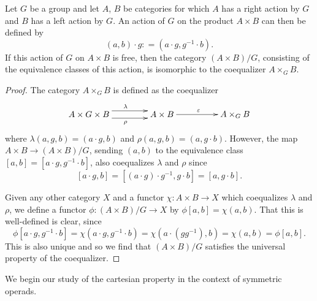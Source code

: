\begin{lem}\label{coeq-lem}
Let $G$ be a group and let $A$, $B$ be categories for which $A$ has a right action by $G$ and $B$ has a left action by $G$. An action of $G$ on the product $A \times B$ can then be defined by
    \[
        (a,b) \cdot g \colon = \left(a \cdot g, g^{-1} \cdot b\right).
    \]
If this action of $G$ on $A \times B$ is free, then the category $(A \times B)/G$, consisting of the equivalence classes of this action, is isomorphic to the coequalizer $A \times_G B$.
\end{lem}
\begin{proof}
The category $A \times_G B$ is defined as the coequalizer
    \[
        \xy
            (0,0)*+{A \times G \times B}="00";
            (30,0)*+{A \times B}="10";
            (60,0)*+{A \times_G B}="20";
            {\ar@<1ex>^{\lambda} "00" ; "10"};
            {\ar@<-1ex>_{\rho} "00" ; "10"};
            {\ar^{\varepsilon} "10" ; "20"};
        \endxy
    \]
where $\lambda(a,g,b) = (a \cdot g, b)$ and $\rho(a,g,b) = (a, g \cdot b)$. However, the map $A \times B \rightarrow (A \times B)/G$, sending $(a,b)$ to the equivalence class $[a,b] = [a \cdot g, g^{-1} \cdot b]$, also coequalizes $\lambda$ and $\rho$ since
    \[
        [a \cdot g, b] = \left[(a \cdot g) \cdot g^{-1}, g \cdot b\right] = [a, g \cdot b].
    \]

Given any other category $X$ and a functor $\chi \colon A \times B \rightarrow X$ which coequalizes $\lambda$ and $\rho$, we define a functor $\phi \colon (A \times B)/G \rightarrow X$ by $\phi[a,b] = \chi(a,b)$. That this is well-defined is clear, since
    \[
        \phi\left[a \cdot g, g^{-1} \cdot b\right] = \chi\left(a \cdot g, g^{-1} \cdot b\right) = \chi\left(a \cdot \left(gg^{-1}\right), b\right) = \chi(a, b) = \phi[a,b].
    \]
This is also unique and so we find that $(A \times B)/G$ satisfies the universal property of the coequalizer.
\end{proof}

We begin our study of the cartesian property in the context of symmetric operads.

